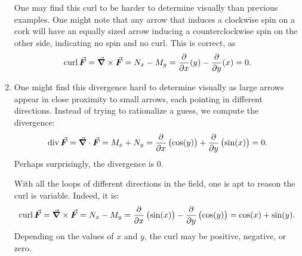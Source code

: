 \begin{example}
\begin{enumerate}
	One may find this curl to be harder to determine visually than previous examples. One might note that any arrow that induces a clockwise spin on a cork will have an equally sized arrow inducing a counterclockwise spin on the other side, indicating no spin and no curl. This is correct, as
	$$\curl \vec F = \vec{\nabla}\times\vec F = N_x-M_y = \frac{\partial}{\partial x}(y) - \frac{\partial}{\partial y}(x) = 0.$$
	

	\item	One might find this divergence hard to determine visually as large arrows appear in close proximity to small arrows, each pointing in different directions. Instead of trying to rationalize a guess, we compute the divergence:
	$$\divv\vec F = \vec{\nabla} \cdot \vec F = M_x + N_y = \frac{\partial}{\partial x}\left(\cos(y)\right) + \frac{\partial}{\partial y}\left(\sin(x)\right) = 0.$$ 
	Perhaps surprisingly, the divergence is 0.
	
	With all the loops of different directions in the field, one is apt to reason the curl is variable. Indeed, it is:
	$$\curl \vec F = \vec{\nabla}\times\vec F = N_x-M_y = \frac{\partial}{\partial x}\left(\sin(x)\right) - \frac{\partial}{\partial y}\left(\cos(y)\right) = \cos(x) + \sin(y).$$
	Depending on the values of $x$ and $y$, the curl may be positive, negative, or zero.
\end{enumerate}



\end{example}



